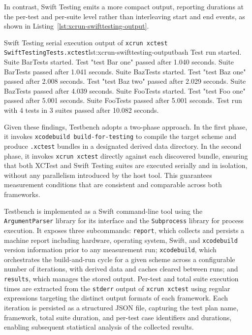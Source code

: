 In contrast, Swift Testing emits a more compact output, reporting durations at the
per-test and per-suite level rather than interleaving start and end events, as shown
in Listing~\ref{lst:xcrun-swifttesting-output}.

\begin{codeblock}{Swift Testing serial execution output of \texttt{xcrun xctest SwiftTestingTests.xctest}}{lst:xcrun-swifttesting-output}{bash}
Test run started.
Suite BarTests started.
Test "test Bar one" passed after 1.040 seconds.
Suite BarTests passed after 1.041 seconds.
Suite BazTests started.
Test "test Baz one" passed after 2.008 seconds.
Test "test Baz two" passed after 2.029 seconds.
Suite BazTests passed after 4.039 seconds.
Suite FooTests started.
Test "test Foo one" passed after 5.001 seconds.
Suite FooTests passed after 5.001 seconds.
Test run with 4 tests in 3 suites passed after 10.082 seconds.
\end{codeblock}

Given these findings, Testbench adopts a two-phase approach. In the first phase, it
invokes \texttt{xcodebuild build-for-testing} to compile the target scheme and
produce \texttt{.xctest} bundles in a designated derived data directory. In the
second phase, it invokes \texttt{xcrun xctest} directly against each discovered
bundle, ensuring that both XCTest and Swift Testing suites are executed serially and
in isolation, without any parallelism introduced by the host tool. This guarantees
measurement conditions that are consistent and comparable across both frameworks.

Testbench is implemented as a Swift command-line tool using the \texttt{ArgumentParser}
library for its interface and the \texttt{Subprocess} library for process execution.
It exposes three subcommands: \texttt{report}, which collects and persists a machine
report including hardware, operating system, Swift, and \texttt{xcodebuild} version
information prior to any measurement run; \texttt{xcodebuild}, which orchestrates
the build-and-run cycle for a given scheme across a configurable number of
iterations, with derived data and caches cleared between runs; and \texttt{results},
which manages the stored output. Per-test and total suite execution times are
extracted from the \texttt{stderr} output of \texttt{xcrun xctest} using regular
expressions targeting the distinct output formats of each framework. Each iteration
is persisted as a structured JSON file, capturing the test plan name, framework,
total suite duration, and per-test case identifiers and durations, enabling
subsequent statistical analysis of the collected results.

